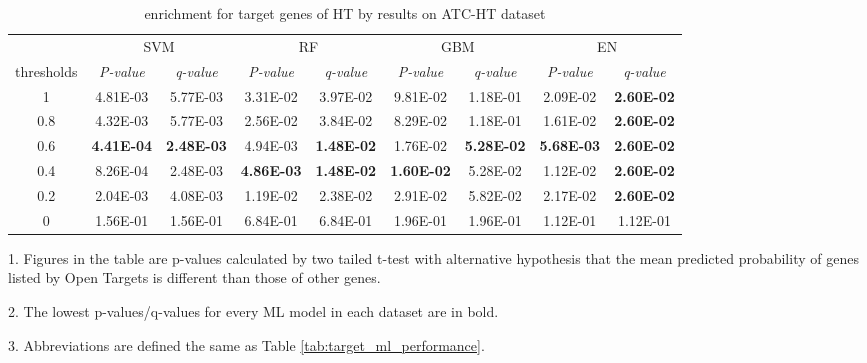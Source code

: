     \begin{table}[htbp]
      \centering
      \caption{enrichment for target genes of HT by results on ATC-HT dataset}
      \begin{threeparttable}
        \tabcolsep=0.10cm
        \begin{tabular}{ccccccccc}
          \toprule
                & \multicolumn{2}{c}{SVM} & \multicolumn{2}{c}{RF} & \multicolumn{2}{c}{GBM} & \multicolumn{2}{c}{EN} \\
          thresholds & \textit{P-value} & \textit{q-value} & \textit{P-value} & \textit{q-value} & \textit{P-value} & \textit{q-value} & \textit{P-value} & \textit{q-value} \\
          \midrule
          1     & 4.81E-03 & 5.77E-03 & 3.31E-02 & 3.97E-02 & 9.81E-02 & 1.18E-01 & 2.09E-02 & \textbf{2.60E-02} \\
          0.8   & 4.32E-03 & 5.77E-03 & 2.56E-02 & 3.84E-02 & 8.29E-02 & 1.18E-01 & 1.61E-02 & \textbf{2.60E-02} \\
          0.6   & \textbf{4.41E-04} & \textbf{2.48E-03} & 4.94E-03 & \textbf{1.48E-02} & 1.76E-02 & \textbf{5.28E-02} & \textbf{5.68E-03} & \textbf{2.60E-02} \\
          0.4   & 8.26E-04 & 2.48E-03 & \textbf{4.86E-03} & \textbf{1.48E-02} & \textbf{1.60E-02} & 5.28E-02 & 1.12E-02 & \textbf{2.60E-02} \\
          0.2   & 2.04E-03 & 4.08E-03 & 1.19E-02 & 2.38E-02 & 2.91E-02 & 5.82E-02 & 2.17E-02 & \textbf{2.60E-02} \\
          0     & 1.56E-01 & 1.56E-01 & 6.84E-01 & 6.84E-01 & 1.96E-01 & 1.96E-01 & 1.12E-01 & 1.12E-01 \\
          \bottomrule
          \end{tabular}%
          \begin{tablenotes}
            \item 1. Figures in the table are p-values calculated by two tailed t-test with alternative hypothesis that the mean predicted probability of genes listed by Open Targets is different than those of other genes. 
            \item 2. The lowest p-values/q-values for every ML model in each dataset are in bold.
            \item 3. Abbreviations are defined the same as Table \ref{tab:target_ml_performance}.  
          \end{tablenotes}
        \end{threeparttable}
        \label{tab:repurposing_enrichment_ht}%
      \end{table}%

